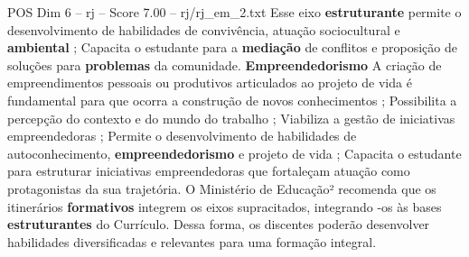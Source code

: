 \begin{textsample}{POS Dim 6 – rj – Score 7.00 – rj/rj\_em\_2.txt}
Esse eixo \textbf{estruturante} permite o desenvolvimento de habilidades de convivência, atuação sociocultural e \textbf{ambiental} ; Capacita o estudante para a \textbf{mediação} de conflitos e proposição de soluções para \textbf{problemas} da comunidade. \textbf{Empreendedorismo} A criação de empreendimentos pessoais ou produtivos articulados ao projeto de vida é fundamental para que ocorra a construção de novos conhecimentos ; Possibilita a percepção do contexto e do mundo do trabalho ; Viabiliza a gestão de iniciativas empreendedoras ; Permite o desenvolvimento de habilidades de autoconhecimento, \textbf{empreendedorismo} e projeto de vida ; Capacita o estudante para estruturar iniciativas empreendedoras que fortaleçam atuação como protagonistas da sua trajetória.
O Ministério de Educação² recomenda que os itinerários \textbf{formativos} integrem os eixos supracitados, integrando -os às bases \textbf{estruturantes} do Currículo.
Dessa forma, os discentes poderão desenvolver habilidades diversificadas e relevantes para uma formação integral.

\end{textsample}
